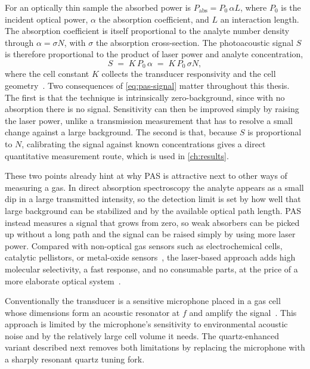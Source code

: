 For an optically thin sample the absorbed power is $P_\text{abs}=P_0\,\alpha L$, where $P_0$ is the incident optical power, $\alpha$ the absorption coefficient, and $L$ an interaction length. The absorption coefficient is itself proportional to the analyte number density through $\alpha=\sigma N$, with $\sigma$ the absorption cross-section. The photoacoustic signal $S$ is therefore proportional to the product of laser power and analyte concentration,
\begin{equation}
  \label{eq:pas-signal}
  S \;=\; K\,P_0\,\alpha \;=\; K\,P_0\,\sigma N,
\end{equation}
where the cell constant $K$ collects the transducer responsivity and the cell geometry~\cite{miklos2001}. Two consequences of \cref{eq:pas-signal} matter throughout this thesis. The first is that the technique is intrinsically zero-background, since with no absorption there is no signal. Sensitivity can then be improved simply by raising the laser power, unlike a transmission measurement that has to resolve a small change against a large background. The second is that, because $S$ is proportional to $N$, calibrating the signal against known concentrations gives a direct quantitative measurement route, which is used in \cref{ch:results}.

These two points already hint at why PAS is attractive next to other ways of measuring a gas. In direct absorption spectroscopy the analyte appears as a small dip in a large transmitted intensity, so the detection limit is set by how well that large background can be stabilized and by the available optical path length. PAS instead measures a signal that grows from zero, so weak absorbers can be picked up without a long path and the signal can be raised simply by using more laser power. Compared with non-optical gas sensors such as electrochemical cells, catalytic pellistors, or metal-oxide sensors~, the laser-based approach adds high molecular selectivity, a fast response, and no consumable parts, at the price of a more elaborate optical system~\cite{miklos2001}.

Conventionally the transducer is a sensitive microphone placed in a gas cell whose dimensions form an acoustic resonator at $f$ and amplify the signal~\cite{miklos2001}. This approach is limited by the microphone's sensitivity to environmental acoustic noise and by the relatively large cell volume it needs. The quartz-enhanced variant described next removes both limitations by replacing the microphone with a sharply resonant quartz tuning fork.

